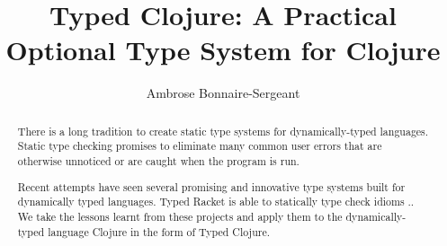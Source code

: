 \documentclass{cshonours}
\title{Typed Clojure: A Practical Optional Type System for Clojure}
\author{Ambrose Bonnaire-Sergeant}
\begin{document}
\maketitle

\begin{abstract}
  There is a long tradition to create static type systems for dynamically-typed
  languages. Static type checking promises to eliminate many common user errors
  that are otherwise unnoticed or are caught when the program is run. 

  Recent attempts have seen several promising and innovative
  type systems built for dynamically typed languages. Typed Racket is able to
  statically type check idioms ..
  We take the lessons learnt from these
  projects and apply them to the dynamically-typed language Clojure in the form of Typed Clojure.
\end{abstract}















%
%

%


\printbibliography[title=References]
\end{document}
